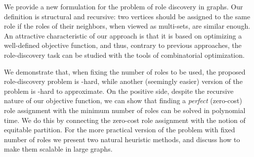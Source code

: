 
We provide a new formulation for the 
problem of role discovery in graphs. 
Our definition is structural and recursive: 
two vertices should be assigned to the same role
if the roles of their neighbors, when viewed as multi-sets, are similar enough.
An attractive characteristic of our approach 
is that it is based on optimizing a well-defined objective function, 
and thus, contrary to previous approaches, 
the role-discovery task can be studied with the tools of combinatorial optimization.

We demonstrate that, when fixing the number of roles to be used, 
the proposed role-discovery problem is \np-hard, 
while another (seemingly easier) version of the problem is \np-hard to approximate.
On the positive side, 
despite the recursive nature of our objective function, 
we can show that finding a \emph{perfect} (zero-cost) role assignment
with the minimum number of roles can be solved in polynomial time. 
We do this by connecting the zero-cost role assignment with the notion of equitable partition.
For the more practical version of the problem with fixed number of roles
we present two natural heuristic methods, 
and discuss how to make them scalable in large graphs.
